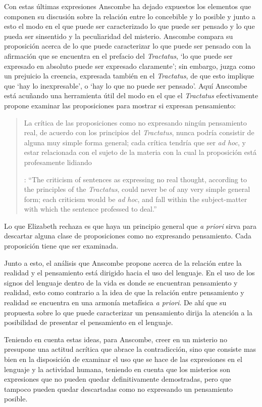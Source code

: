 Con estas últimas expresiones Anscombe ha dejado expuestos los elementos que componen su discusión sobre la relación entre lo concebible y lo posible y junto a esto el modo en el que puede ser caracterizado lo que puede ser pensado y lo que pueda ser sinsentido y la peculiaridad del misterio. Anscombe compara su proposición acerca de lo que puede caracterizar lo que puede ser pensado con la afirmación que se encuentra en el prefacio del \emph{Tractatus}, \enquote*{lo que puede ser expresado en absoluto puede ser expresado claramente}; sin embargo, juzga como un prejuicio la creencia, expresada también en el \emph{Tractatus}, de que esto implique que \enquote*{hay lo inexpresable}, o \enquote*{hay lo que no puede ser pensado}. Aquí Anscombe está acuñando una herramienta útil del modo en el que el \emph{Tractatus} efectivamente propone examinar las proposiciones para mostrar si expresan pensamiento: \blockquote[{\cite[151]{anscombe1959iwt}}: \enquote{The criticism of sentences as expressing no real thought, according to the principles of the \emph{Tractatus}, could never be of any very simple general form; each criticism would be \emph{ad hoc}, and fall within the subject-matter with which the sentence professed to deal.}]{La crítica de las proposiciones como no expresando ningún pensamiento real, de acuerdo con los principios del \emph{Tractatus}, nunca podría consistir de alguna muy simple forma general; cada crítica tendría que ser \emph{ad hoc}, y estar relacionada con el sujeto de la materia con la cual la proposición está profesamente lidiando}. Lo que Elizabeth rechaza es que haya un principio general que \emph{a priori} sirva para descartar alguna clase de proposiciones como no expresando pensamiento. Cada proposición tiene que ser examinada.

Junto a esto, el análisis que Anscombe propone acerca de la relación entre la realidad y el pensamiento está dirigido hacia el uso del lenguaje. En el uso de los signos del lenguaje dentro de la vida es donde se encuentran pensamiento y realidad, esto como contrario a la idea de que la relación entre pensamiento y realidad se encuentra en una armonía metafísica \emph{a priori}. De ahí que su propuesta sobre lo que puede caracterizar un pensamiento dirija la atención a la posibilidad de presentar el pensamiento en el lenguaje.

Teniendo en cuenta estas ideas, para Anscombe, creer en un misterio no presupone una actitud acrítica que abrace la contradicción, sino que consiste mas bien en la disposición de examinar el uso que se hace de las expresiones en el lenguaje y la actividad humana, teniendo en cuenta que los misterios son expresiones que no pueden quedar definitivamente demostradas, pero que tampoco pueden quedar descartadas como no expresando un pensamiento posible.
